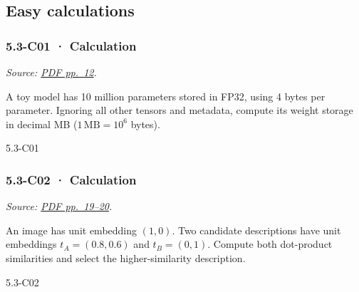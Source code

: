 \subsection{Easy calculations}\label{easy-calculations-15}

\noindent\begin{minipage}{\linewidth}

\subsubsection{5.3-C01 · Calculation}\label{c01-calculation-14}

\emph{Source:
\href{../Lecture\%20Slides/5.3.\%20Foundation\%20models.pdf\#page=12}{PDF
pp.~12}.}

A toy model has 10 million parameters stored in FP32, using 4 bytes per
parameter. Ignoring all other tensors and metadata, compute its weight
storage in decimal MB (\(1\,\mathrm{MB}=10^6\) bytes).

\begin{solution}[26mm]{5.3-C01}

\end{solution}
\end{minipage}\par\medskip

\noindent\begin{minipage}{\linewidth}

\subsubsection{5.3-C02 · Calculation}\label{c02-calculation-14}

\emph{Source:
\href{../Lecture\%20Slides/5.3.\%20Foundation\%20models.pdf\#page=19}{PDF
pp.~19--20}.}

An image has unit embedding \((1,0)\). Two candidate descriptions have
unit embeddings \(t_A=(0.8,0.6)\) and \(t_B=(0,1)\). Compute both
dot-product similarities and select the higher-similarity description.

\begin{solution}[26mm]{5.3-C02}

\end{solution}
\end{minipage}\par\medskip

